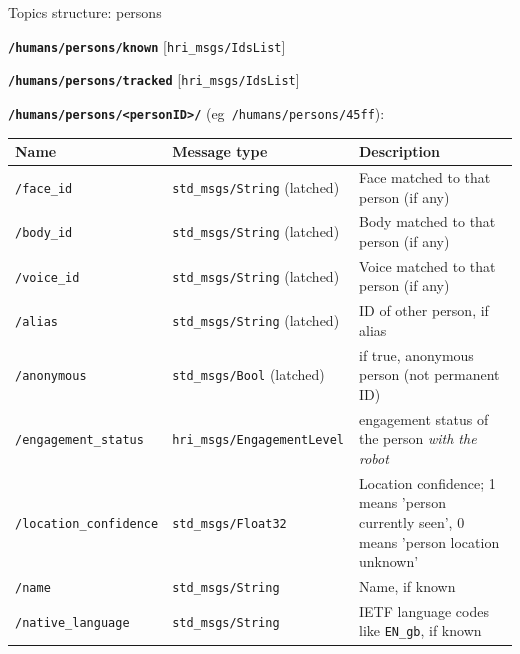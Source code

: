 \documentclass[xcolor=table,aspectratio=169]{beamer}
\begin{document}
\begin{frame}{Topics structure: persons}

    \textbf{\texttt{/humans/persons/known}}
    [\texttt{hri\_msgs/IdsList}]

    \textbf{\texttt{/humans/persons/tracked}}
    [\texttt{hri\_msgs/IdsList}]


    \vspace{1em}
    \pause

    \textbf{\texttt{/humans/persons/<personID>/}} (eg~\texttt{/humans/persons/45ff}):

    \scriptsize
    \begin{tabular}{@{}p{3cm}p{4cm}p{6cm}@{}}
        \toprule
        \textbf{Name} & \textbf{Message type}         & \textbf{Description}                                                \\ \midrule
        \texttt{/face\_id            } & \texttt{std\_msgs/String} (latched) & Face matched to that person (if any)                                                    \\
        \texttt{/body\_id            } & \texttt{std\_msgs/String} (latched) & Body matched to that person (if any)                                                    \\
        \texttt{/voice\_id           } & \texttt{std\_msgs/String} (latched) & Voice matched to that person (if any)                                                   \\
        \texttt{/alias           } & \texttt{std\_msgs/String} (latched) & ID of other person, if alias                                                    \\
        \texttt{/anonymous           } & \texttt{std\_msgs/Bool} (latched) & if true, anonymous person (not permanent ID)   \\
        \texttt{/engagement\_status} & \texttt{hri\_msgs/EngagementLevel        }  & engagement status of the person \emph{with the robot} \\
        \texttt{/location\_confidence} & \texttt{std\_msgs/Float32        }  & Location confidence; 1 means 'person currently seen', 0 means 'person location unknown' \\
        \texttt{/name                } & \texttt{std\_msgs/String         }  & Name, if known                                                                          \\
        \texttt{/native\_language    } & \texttt{std\_msgs/String         }  & IETF language codes like \texttt{EN\_gb}, if known    \\
\bottomrule
\end{tabular}
    
\end{frame}
\end{document}
